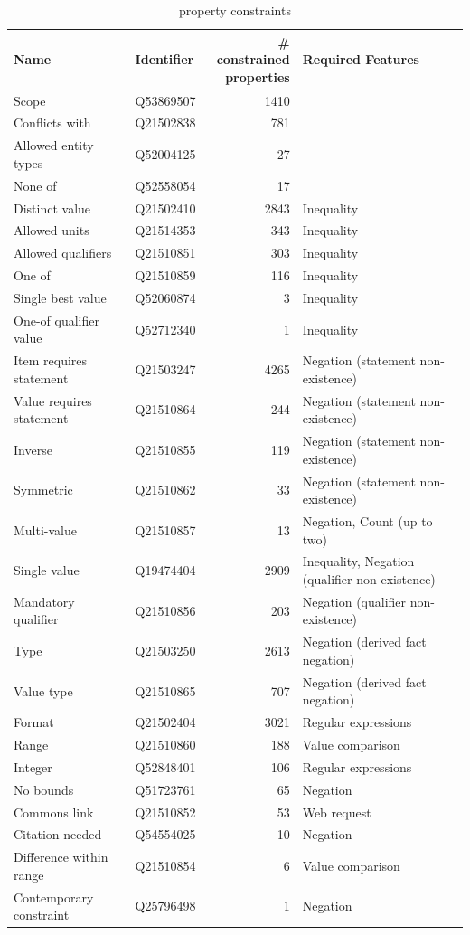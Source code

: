 \documentclass[hyperref,bachelorofscience,fleqn]{cgvpub}
\begin{document}
\begin{table}[H]
\caption{property constraints}\label{tab_property_constraints}
\begin{tabular}{llrp{6.5cm}}
Name & Identifier & \makecell{\# constrained \\ properties} & Required Features \\
\hline
Scope & Q53869507 & 1410 & \\
Conflicts with & Q21502838 & 781 & \\
Allowed entity types & Q52004125 & 27 & \\
None of & Q52558054 & 17 & \\
\hline
Distinct value & Q21502410 & 2843 & Inequality \\
Allowed units & Q21514353 & 343 & Inequality \\
Allowed qualifiers & Q21510851 & 303 & Inequality \\
One of & Q21510859 & 116 & Inequality \\
Single best value & Q52060874 & 3 & Inequality \\
One-of qualifier value & Q52712340 & 1 & Inequality \\
\hline
Item requires statement & Q21503247 & 4265 & Negation (statement non-existence) \\
Value requires statement & Q21510864 & 244 & Negation (statement non-existence) \\
Inverse & Q21510855 & 119 & Negation (statement non-existence) \\
Symmetric & Q21510862 & 33 & Negation (statement non-existence) \\
Multi-value & Q21510857 & 13 & Negation, Count (up to two)  \\
Single value & Q19474404 & 2909 & Inequality, Negation (qualifier non-existence) \\
Mandatory qualifier & Q21510856 & 203 & Negation (qualifier non-existence) \\
\hline
Type & Q21503250 & 2613 & Negation (derived fact negation) \\
Value type & Q21510865 & 707 & Negation (derived fact negation) \\
Format & Q21502404 & 3021 & Regular expressions \\
Range & Q21510860 & 188 & Value comparison \\
Integer & Q52848401 & 106 & Regular expressions \\
No bounds & Q51723761 & 65 & Negation  \\
Commons link & Q21510852 & 53 & Web request \\
Citation needed & Q54554025 & 10 & Negation \\
Difference within range & Q21510854 & 6 & Value comparison \\
Contemporary constraint & Q25796498 & 1 & Negation  \\
\end{tabular}
\end{table}
\end{document}
